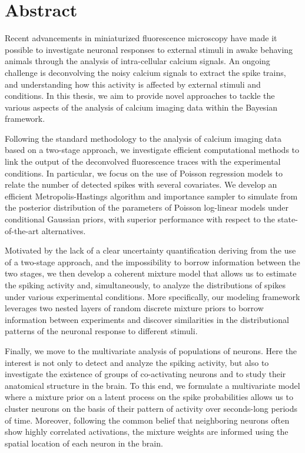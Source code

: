 \chapter*{Abstract} 
Recent advancements in miniaturized fluorescence microscopy have made it possible to investigate neuronal responses to external stimuli in awake behaving animals through the analysis of intra-cellular calcium signals. 
An ongoing challenge is deconvolving the noisy calcium signals to extract the spike trains, and understanding how this activity is affected by external stimuli and conditions.
In this thesis, we aim to provide novel approaches to tackle the various aspects of the analysis of calcium imaging data within the Bayesian framework.

Following the standard methodology to the analysis of calcium imaging data based on a two-stage approach, we investigate efficient computational methods to link the output of the deconvolved fluorescence traces with the experimental conditions. In particular, we focus on the use of Poisson regression models to relate the number of detected spikes with several covariates. We develop an efficient Metropolis-Hastings algorithm and importance sampler to simulate from the posterior distribution of the parameters of Poisson log-linear models under conditional Gaussian priors, with superior performance with respect to the state-of-the-art alternatives. 

Motivated by the lack of a clear uncertainty quantification deriving from the use of a two-stage approach, and the impossibility to borrow information between the two stages, we then develop a coherent mixture model that allows us to estimate the spiking activity and, simultaneously, to analyze the distributions of spikes under various experimental conditions. More specifically, our modeling framework leverages two nested layers of random discrete mixture priors to borrow information between experiments and discover similarities in the distributional patterns of the neuronal response to different stimuli.

Finally, we move to the multivariate analysis of populations of neurons. Here the interest is not only to detect and analyze the spiking activity, but also to investigate the existence of groups of co-activating neurons and to study their anatomical structure in the brain. To this end, we formulate a multivariate model where a mixture prior on a latent process on the spike probabilities allows us to cluster neurons on the basis of their pattern of activity over seconds-long periods of time. Moreover, following the common belief that neighboring neurons often show highly correlated activations, the mixture weights are informed using the spatial location of each neuron in the brain.
